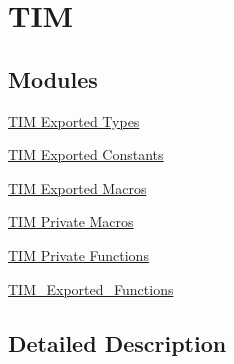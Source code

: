 \hypertarget{group___t_i_m}{}\section{T\+IM}
\label{group___t_i_m}
\subsection*{Modules}
\begin{DoxyCompactItemize}
\item 
\hyperlink{group___t_i_m___exported___types}{T\+I\+M Exported Types}
\item 
\hyperlink{group___t_i_m___exported___constants}{T\+I\+M Exported Constants}
\item 
\hyperlink{group___t_i_m___exported___macros}{T\+I\+M Exported Macros}
\item 
\hyperlink{group___t_i_m___private___macros}{T\+I\+M Private Macros}
\item 
\hyperlink{group___t_i_m___private___functions}{T\+I\+M Private Functions}
\item 
\hyperlink{group___t_i_m___exported___functions}{T\+I\+M\+\_\+\+Exported\+\_\+\+Functions}
\end{DoxyCompactItemize}


\subsection{Detailed Description}
